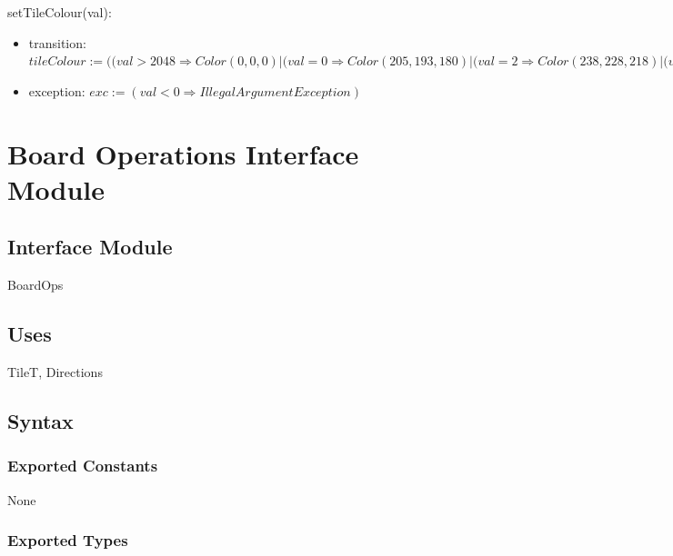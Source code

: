 \documentclass[12pt]{article}
\begin{document}
\noindent setTileColour(val):
\begin{itemize}
\item transition: $tileColour := ((val > 2048 \Rightarrow Color(0, 0, 0) \vert (val = 0 \Rightarrow Color(205, 193, 180) \vert (val = 2 \Rightarrow Color(238, 228, 218) \vert (val = 4 \Rightarrow Color(236, 224, 202) \vert (val = 8 \Rightarrow Color(242, 177, 121) \vert (val = 16 \Rightarrow Color(236, 141, 85) \vert (val = 32 \Rightarrow Color(247, 124, 95) \vert (val = 64 \Rightarrow Color(234, 90, 56) \vert (val = 128 \Rightarrow Color(244, 216, 107) \vert (val = 256 \Rightarrow Color(242, 208, 75) \vert (val = 512 \Rightarrow Color(228, 193, 42) \vert (val = 1024 \Rightarrow Color(227, 186, 19) \vert (val = 2048 \Rightarrow Color(236, 196, 2) \vert True \Rightarrow True)$
\item exception: $exc := (val < 0 \Rightarrow IllegalArgumentException)$
\end{itemize}

\newpage

\section* {Board Operations Interface Module}

\subsection*{Interface Module}

BoardOps

\subsection* {Uses}

TileT, Directions

\subsection* {Syntax}

\subsubsection* {Exported Constants}

None

\subsubsection* {Exported Types}
\end{document}
